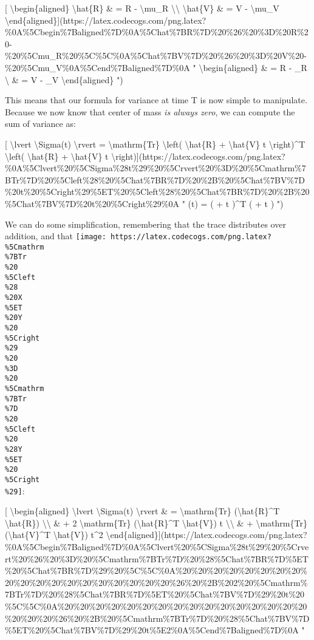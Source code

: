\documentclass[]{article}
\begin{document}
{[} \textbackslash{}begin\{aligned\} \textbackslash{}hat\{R\} \& = R -
\textbackslash{}mu\_R \textbackslash{}\textbackslash{} \textbackslash{}hat\{V\}
\& = V - \textbackslash{}mu\_V
\textbackslash{}end\{aligned\}{]}(https://latex.codecogs.com/png.latex?\%0A\%5Cbegin\%7Baligned\%7D\%0A\%5Chat\%7BR\%7D\%20\%26\%20\%3D\%20R\%20-\%20\%5Cmu\_R\%20\%5C\%5C\%0A\%5Chat\%7BV\%7D\%20\%26\%20\%3D\%20V\%20-\%20\%5Cmu\_V\%0A\%5Cend\%7Baligned\%7D\%0A
" \textbackslash{}begin\{aligned\}  \& = R - \mu\_R \textbackslash{}
 \& = V - \mu\_V \textbackslash{}end\{aligned\} ")

This means that our formula for variance at time T is now simple to manipulate.
Because we now know that center of mass \emph{is always zero}, we can compute
the sum of variance as:

{[} \textbackslash{}lvert \textbackslash{}Sigma(t) \textbackslash{}rvert =
\textbackslash{}mathrm\{Tr\} \textbackslash{}left( \textbackslash{}hat\{R\} +
\textbackslash{}hat\{V\} t \textbackslash{}right)\^{}T \textbackslash{}left(
\textbackslash{}hat\{R\} + \textbackslash{}hat\{V\} t
\textbackslash{}right){]}(https://latex.codecogs.com/png.latex?\%0A\%5Clvert\%20\%5CSigma\%28t\%29\%20\%5Crvert\%20\%3D\%20\%5Cmathrm\%7BTr\%7D\%20\%5Cleft\%28\%20\%5Chat\%7BR\%7D\%20\%2B\%20\%5Chat\%7BV\%7D\%20t\%20\%5Cright\%29\%5ET\%20\%5Cleft\%28\%20\%5Chat\%7BR\%7D\%20\%2B\%20\%5Chat\%7BV\%7D\%20t\%20\%5Cright\%29\%0A
" \lvert \Sigma(t) \rvert =  \left(  +  t \right)\^{}T
\left(  +  t \right) ")

We can do some simplification, remembering that the trace distributes over
addition, and that
\texttt{[image: https://latex.codecogs.com/png.latex?\\\%5Cmathrm\\\%7BTr\\\%20\\\%5Cleft\\\%28\\\%20X\\\%5ET\\\%20Y\\\%20\\\%5Cright\\\%29\\\%20\\\%3D\\\%20\\\%5Cmathrm\\\%7BTr\\\%7D\\\%20\\\%5Cleft\\\%20\\\%28Y\\\%5ET\\\%20\\\%5Cright\\\%29]}:

{[} \textbackslash{}begin\{aligned\} \textbackslash{}lvert
\textbackslash{}Sigma(t) \textbackslash{}rvert \& = \textbackslash{}mathrm\{Tr\}
(\textbackslash{}hat\{R\}\^{}T \textbackslash{}hat\{R\})
\textbackslash{}\textbackslash{} \& + 2 \textbackslash{}mathrm\{Tr\}
(\textbackslash{}hat\{R\}\^{}T \textbackslash{}hat\{V\}) t
\textbackslash{}\textbackslash{} \& + \textbackslash{}mathrm\{Tr\}
(\textbackslash{}hat\{V\}\^{}T \textbackslash{}hat\{V\}) t\^{}2
\textbackslash{}end\{aligned\}{]}(https://latex.codecogs.com/png.latex?\%0A\%5Cbegin\%7Baligned\%7D\%0A\%5Clvert\%20\%5CSigma\%28t\%29\%20\%5Crvert\%20\%26\%20\%3D\%20\%5Cmathrm\%7BTr\%7D\%20\%28\%5Chat\%7BR\%7D\%5ET\%20\%5Chat\%7BR\%7D\%29\%20\%5C\%5C\%0A\%20\%20\%20\%20\%20\%20\%20\%20\%20\%20\%20\%20\%20\%20\%20\%20\%20\%20\%20\%26\%20\%2B\%202\%20\%5Cmathrm\%7BTr\%7D\%20\%28\%5Chat\%7BR\%7D\%5ET\%20\%5Chat\%7BV\%7D\%29\%20t\%20\%5C\%5C\%0A\%20\%20\%20\%20\%20\%20\%20\%20\%20\%20\%20\%20\%20\%20\%20\%20\%20\%20\%20\%26\%20\%2B\%20\%5Cmathrm\%7BTr\%7D\%20\%28\%5Chat\%7BV\%7D\%5ET\%20\%5Chat\%7BV\%7D\%29\%20t\%5E2\%0A\%5Cend\%7Baligned\%7D\%0A
"
\end{document}
